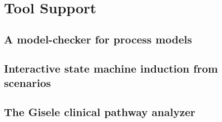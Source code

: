 \chapter{Tool Support\label{chapter:tool-support}}

\section{A model-checker for process models}
\section{Interactive state machine induction from scenarios}
\section{The Gisele clinical pathway analyzer}

